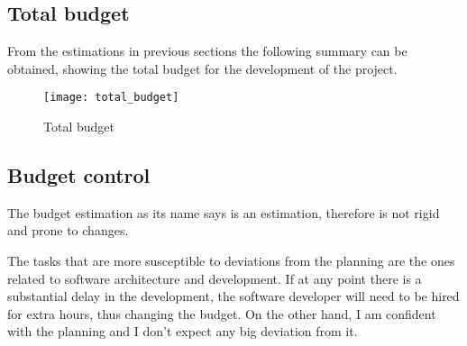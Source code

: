 \subsection{Total budget}

From the estimations in previous sections the following summary can be obtained, showing 
the total budget for the development of the project.

\begin{figure}[h]
    \centering
    \texttt{[image: total\_budget]}
    \caption{Total budget}
    \label{fig:total_budget}
\end{figure}

\subsection{Budget control}

The budget estimation as its name says is an estimation, therefore is not rigid and 
prone to changes.

The tasks that are more susceptible to deviations from the planning are the ones related 
to software architecture and development. If at any point there is a substantial delay 
in the development, the software developer will need to be hired for extra hours, 
thus changing the budget. On the other hand, I am confident with the planning and 
I don't expect any big deviation from it.
